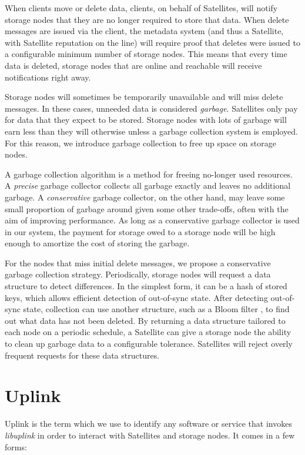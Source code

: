 \documentclass[8pt,fleqn,openany]{book}
\begin{document}
When clients move or delete data, clients, on behalf of Satellites, will notify
storage nodes
that they are no longer required to store that data.
When delete messages are issued via the client, the metadata system (and thus a
Satellite, with Satellite reputation on the line) will require proof that
deletes were issued to a configurable minimum number of storage nodes.
This means that every time
data is deleted, storage nodes that are online and reachable will receive
notifications right away.

Storage nodes will sometimes be temporarily unavailable and will miss delete
messages. In these cases, unneeded data is considered
{\em garbage}. Satellites only pay for data that they expect to be stored. Storage
nodes with lots of garbage will earn less than they will
otherwise unless a garbage collection system is employed. For this reason, we
introduce garbage collection to free up space on storage nodes.

A garbage collection algorithm is a method for freeing no-longer used resources.
A {\em precise} garbage collector collects all garbage exactly and
leaves no additional garbage. A {\em conservative} garbage collector, on the
other hand, may
leave some small proportion of garbage around given some other trade-offs,
often with the aim of improving performance.
As long as a conservative garbage collector is used in our system, the payment for
storage owed to a storage node will be high enough to amortize the cost of
storing the garbage.

For the nodes that miss initial delete messages, we propose a conservative
garbage collection strategy. Periodically, storage nodes will request
a data structure to detect differences. In the simplest form, it can be a hash
of stored keys, which allows efficient detection of out-of-sync state. After
detecting out-of-sync state, collection can use another structure, such as a
Bloom filter \cite{bloom-filter}, to find out what data has not been
deleted.
By returning a data
structure tailored to each node on a periodic schedule, a Satellite can give a
storage node the ability to clean up garbage data to a configurable tolerance.
Satellites will reject overly frequent requests for these data structures.

\section{Uplink}

Uplink is the term which we use to identify any software or service that invokes {\em libuplink} in order to interact with Satellites and storage nodes. It comes
in a few forms:
\end{document}
